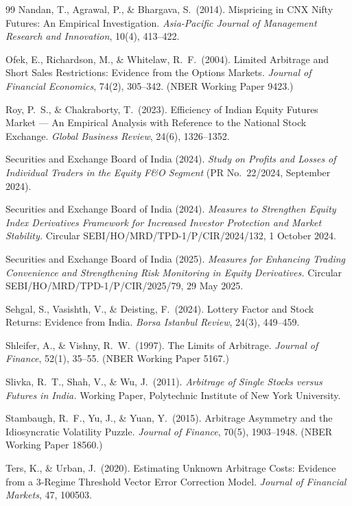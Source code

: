 \begin{thebibliography}{99}
 Nandan, T., Agrawal, P., \& Bhargava, S.\ (2014). Mispricing in CNX Nifty Futures: An Empirical Investigation. \emph{Asia-Pacific Journal of Management Research and Innovation}, 10(4), 413--422.

 Ofek, E., Richardson, M., \& Whitelaw, R.\ F.\ (2004). Limited Arbitrage and Short Sales Restrictions: Evidence from the Options Markets. \emph{Journal of Financial Economics}, 74(2), 305--342. (NBER Working Paper 9423.)

 Roy, P.\ S., \& Chakraborty, T.\ (2023). Efficiency of Indian Equity Futures Market --- An Empirical Analysis with Reference to the National Stock Exchange. \emph{Global Business Review}, 24(6), 1326--1352.

 Securities and Exchange Board of India (2024). \emph{Study on Profits and Losses of Individual Traders in the Equity F\&O Segment} (PR No.\ 22/2024, September 2024).

 Securities and Exchange Board of India (2024). \emph{Measures to Strengthen Equity Index Derivatives Framework for Increased Investor Protection and Market Stability.} Circular SEBI/HO/MRD/TPD-1/P/CIR/2024/132, 1 October 2024.

 Securities and Exchange Board of India (2025). \emph{Measures for Enhancing Trading Convenience and Strengthening Risk Monitoring in Equity Derivatives.} Circular SEBI/HO/MRD/TPD-1/P/CIR/2025/79, 29 May 2025.

 Sehgal, S., Vasishth, V., \& Deisting, F.\ (2024). Lottery Factor and Stock Returns: Evidence from India. \emph{Borsa Istanbul Review}, 24(3), 449--459.

 Shleifer, A., \& Vishny, R.\ W.\ (1997). The Limits of Arbitrage. \emph{Journal of Finance}, 52(1), 35--55. (NBER Working Paper 5167.)

 Slivka, R.\ T., Shah, V., \& Wu, J.\ (2011). \emph{Arbitrage of Single Stocks versus Futures in India.} Working Paper, Polytechnic Institute of New York University.

 Stambaugh, R.\ F., Yu, J., \& Yuan, Y.\ (2015). Arbitrage Asymmetry and the Idiosyncratic Volatility Puzzle. \emph{Journal of Finance}, 70(5), 1903--1948. (NBER Working Paper 18560.)

 Ters, K., \& Urban, J.\ (2020). Estimating Unknown Arbitrage Costs: Evidence from a 3-Regime Threshold Vector Error Correction Model. \emph{Journal of Financial Markets}, 47, 100503.


\end{thebibliography}
